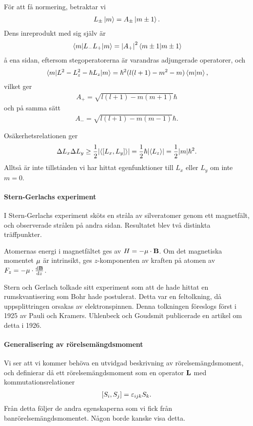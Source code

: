 För att få normering, betraktar vi
\begin{align*}
	L_{\pm}\ket{m} = A_{\pm}\ket{m\pm 1}.
\end{align*}
Dens inreprodukt med sig själv är
\begin{align*}
	\expval{L_{-}L_{+}}{m} = \abs{A_{+}}^{2}\braket{m \pm 1}
\end{align*}
å ena sidan, eftersom stegoperatorerna är varandras adjungerade operatorer, och
\begin{align*}
	\expval{L^{2} - L_{z}^{2} - \hbar L_{z}}{m} = \hbar^{2}(l(l + 1) - m^{2} - m)\braket{m},
\end{align*}
vilket ger
\begin{align*}
	A_{+} = \sqrt{l(l + 1)- m(m + 1)}\hbar
\end{align*}
och på samma sätt
\begin{align*}
	A_{-} = \sqrt{l(l + 1)- m(m - 1)}\hbar.
\end{align*}

Osäkerhetsrelationen ger
\begin{align*}
	\Delta L_{x}\Delta L_{y} \geq \frac{1}{2}\abs{\expval{[L_{x}, L_{y}]}} = \frac{1}{2}\hbar\abs{\expval{L_{z}}} = \frac{1}{2}\abs{m}\hbar^{2}.
\end{align*}
Alltså är inte tillstånden vi har hittat egenfunktioner till $L_{x}$ eller $L_{y}$ om inte $m = 0$.

\paragraph{Stern-Gerlachs experiment}
I Stern-Gerlachs experiment sköts en stråla av silveratomer genom ett magnetfält, och observerade strålen på andra sidan. Resultatet blev två distinkta träffpunkter.

Atomernas energi i magnetfältet ges av $H = -\vb{\mu}\cdot\vb{B}$. Om det magnetiska momentet $\vb{\mu}$ är intrinsikt, ges $z$-komponenten av kraften på atomen av $F_{z} = -\vb{\mu}\cdot\dv{\vb{B}}{z}$.

Stern och Gerlach tolkade sitt experiment som att de hade hittat en rumskvantisering som Bohr hade postulerat. Detta var en feltolkning, då uppsplittringen orsakas av elektronspinnen. Denna tolkningen föreslogs först i 1925 av Pauli och Kramers. Uhlenbeck och Goudsmit publicerade en artikel om detta i 1926.

\paragraph{Generalisering av rörelsemängdsmoment}
Vi ser att vi kommer behöva en utvidgad beskrivning av rörelsemängdsmoment, och definierar då ett rörelsemängdsmoment som en operator $\vb{L}$ med kommutationsrelationer
\begin{align*}
	[S_{i}, S_{j}] = \varepsilon_{ijk}S_{k}.
\end{align*}
Från detta följer de andra egenskaperna som vi fick från banrörelsemängdsmomentet. Någon borde kanske visa detta.

